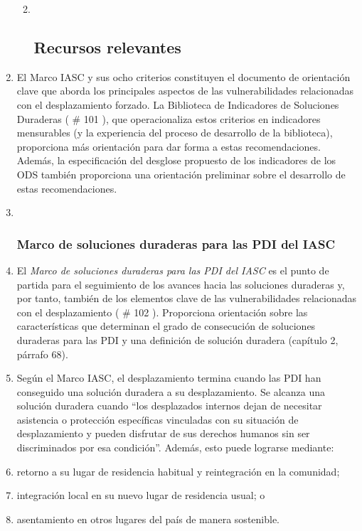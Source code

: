 \documentclass[
]{book}
\begin{document}
\begin{enumerate}
  \begin{enumerate}
  \def\labelenumii{\arabic{enumii}.}
  \item ~
    \hypertarget{recursos-relevantes}{%
    \subsection{Recursos relevantes}\label{recursos-relevantes}}
  \end{enumerate}
\item
  El Marco IASC y sus ocho criterios constituyen el documento de orientación clave que aborda los principales aspectos de las vulnerabilidades relacionadas con el desplazamiento forzado. La Biblioteca de Indicadores de Soluciones Duraderas (
  \# 101
  ), que operacionaliza estos criterios en indicadores mensurables (y la experiencia del proceso de desarrollo de la biblioteca), proporciona más orientación para dar forma a estas recomendaciones. Además, la especificación del desglose propuesto de los indicadores de los ODS también proporciona una orientación preliminar sobre el desarrollo de estas recomendaciones.
\item ~
  \hypertarget{marco-de-soluciones-duraderas-para-las-pdi-del-iasc}{%
  \subsubsection{Marco de soluciones duraderas para las PDI del IASC}\label{marco-de-soluciones-duraderas-para-las-pdi-del-iasc}}
\item
  El \emph{Marco de soluciones duraderas para las PDI del IASC} es el punto de partida para el seguimiento de los avances hacia las soluciones duraderas y, por tanto, también de los elementos clave de las vulnerabilidades relacionadas con el desplazamiento (
  \# 102
  ). Proporciona orientación sobre las características que determinan el grado de consecución de soluciones duraderas para las PDI y una definición de solución duradera (capítulo 2, párrafo 68).
\item
  Según el Marco IASC, el desplazamiento termina cuando las PDI han conseguido una solución duradera a su desplazamiento. Se alcanza una solución duradera cuando ``los desplazados internos dejan de necesitar asistencia o protección específicas vinculadas con su situación de desplazamiento y pueden disfrutar de sus derechos humanos sin ser discriminados por esa condición''. Además, esto puede lograrse mediante:
\item
  retorno a su lugar de residencia habitual y reintegración en la comunidad;
\item
  integración local en su nuevo lugar de residencia usual; o
\item
  asentamiento en otros lugares del país de manera sostenible.
\end{enumerate}
\end{document}
